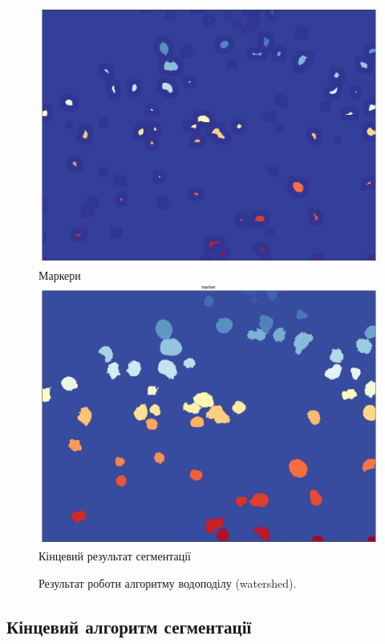 \begin{figure}[t!]
	\centering	
	\includegraphics[width=0.95\linewidth]{Figures/Chapter2/5a.png}
	Маркери
	\endminipage\hfill
	\centering	
	\includegraphics[width=0.95\linewidth]{Figures/Chapter2/5b.png}
	Кінцевий результат сегментації
	\endminipage\hfill
	
	\caption{Результат роботи алгоритму водоподілу (watershed).}
	\label{fig:watershed}
\end{figure}

\subsection{Кінцевий алгоритм сегментації}

